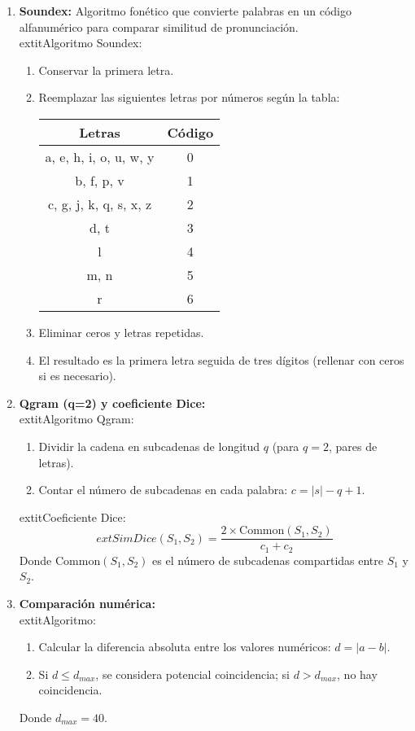 \documentclass{article}
\begin{document}
\begin{enumerate}
    \item \textbf{Soundex:} Algoritmo fonético que convierte palabras en un código alfanumérico para comparar similitud de pronunciación.\\
    	extit{Algoritmo Soundex:}
    \begin{enumerate}
        \item Conservar la primera letra.
        \item Reemplazar las siguientes letras por números según la tabla:
        \begin{tabular}{|c|c|}
        \hline
        Letras & Código \\
        \hline
        a, e, h, i, o, u, w, y & 0 \\
        b, f, p, v & 1 \\
        c, g, j, k, q, s, x, z & 2 \\
        d, t & 3 \\
        l & 4 \\
        m, n & 5 \\
        r & 6 \\
        \hline
        \end{tabular}
        \item Eliminar ceros y letras repetidas.
        \item El resultado es la primera letra seguida de tres dígitos (rellenar con ceros si es necesario).
    \end{enumerate}

    \item \textbf{Qgram (q=2) y coeficiente Dice:}\\
    	extit{Algoritmo Qgram:}
    \begin{enumerate}
        \item Dividir la cadena en subcadenas de longitud $q$ (para $q=2$, pares de letras).
        \item Contar el número de subcadenas en cada palabra: $c = |s| - q + 1$.
    \end{enumerate}
    	extit{Coeficiente Dice:}
    \[
    	ext{SimDice}(S_1, S_2) = \frac{2 \times \text{Common}(S_1, S_2)}{c_1 + c_2}
    \]
    Donde $\text{Common}(S_1, S_2)$ es el número de subcadenas compartidas entre $S_1$ y $S_2$.

    \item \textbf{Comparación numérica:}\\
    	extit{Algoritmo:}
    \begin{enumerate}
        \item Calcular la diferencia absoluta entre los valores numéricos: $d = |a - b|$.
        \item Si $d \leq d_{max}$, se considera potencial coincidencia; si $d > d_{max}$, no hay coincidencia.
    \end{enumerate}
    Donde $d_{max}=40$.


\end{enumerate}
\end{document}
